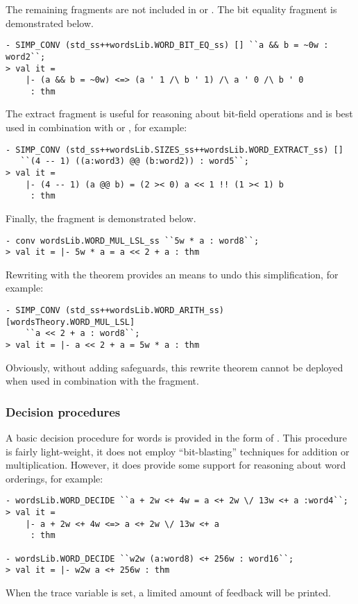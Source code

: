 The remaining fragments are not included in  or .  The bit equality fragment is demonstrated below.
\begin{session}
\begin{verbatim}
- SIMP_CONV (std_ss++wordsLib.WORD_BIT_EQ_ss) [] ``a && b = ~0w : word2``;
> val it =
    |- (a && b = ~0w) <=> (a ' 1 /\ b ' 1) /\ a ' 0 /\ b ' 0
     : thm
\end{verbatim}
\end{session}
The extract fragment is useful for reasoning about bit-field operations and is best used in combination with  or , for example:
\begin{session}
\begin{verbatim}
- SIMP_CONV (std_ss++wordsLib.SIZES_ss++wordsLib.WORD_EXTRACT_ss) []
   ``(4 -- 1) ((a:word3) @@ (b:word2)) : word5``;
> val it =
    |- (4 -- 1) (a @@ b) = (2 >< 0) a << 1 !! (1 >< 1) b
     : thm
\end{verbatim}
\end{session}
Finally, the fragment  is demonstrated below.
\begin{session}
\begin{verbatim}
- conv wordsLib.WORD_MUL_LSL_ss ``5w * a : word8``;
> val it = |- 5w * a = a << 2 + a : thm
\end{verbatim}
\end{session}
Rewriting with the theorem  provides an means to undo this simplification, for example:
\begin{session}
\begin{verbatim}
- SIMP_CONV (std_ss++wordsLib.WORD_ARITH_ss) [wordsTheory.WORD_MUL_LSL]
    ``a << 2 + a : word8``;
> val it = |- a << 2 + a = 5w * a : thm
\end{verbatim}
\end{session}
Obviously, without adding safeguards, this rewrite theorem cannot be deployed when used in combination with the  fragment.

\subsubsection{Decision procedures}

A basic decision procedure for words is provided in the form of .  This procedure is fairly light-weight, \eg{} it does not employ ``bit-blasting'' techniques for addition or multiplication.  However, it does provide some support for reasoning about word orderings, for example:
\begin{session}
\begin{verbatim}
- wordsLib.WORD_DECIDE ``a + 2w <+ 4w = a <+ 2w \/ 13w <+ a :word4``;
> val it =
    |- a + 2w <+ 4w <=> a <+ 2w \/ 13w <+ a
     : thm

- wordsLib.WORD_DECIDE ``w2w (a:word8) <+ 256w : word16``;
> val it = |- w2w a <+ 256w : thm
\end{verbatim}
\end{session}
When the trace variable  is set, a limited amount of feedback will be printed.

